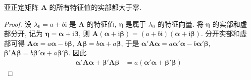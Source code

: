 \documentclass[../../main.tex]{subfiles}
\begin{document}
\begin{proposition}\label{proposition:亚正定矩阵的所有特征值的实部都大于零}
亚正定矩阵 \(\boldsymbol{A}\) 的所有特征值的实部都大于零.
\end{proposition}
\begin{proof}
设 \(\lambda_0 = a + b\mathrm{i}\) 是 \(\boldsymbol{A}\) 的特征值, \(\boldsymbol{\eta}\) 是属于 \(\lambda_0\) 的特征向量. 将 \(\boldsymbol{\eta}\) 的实部和虚部分开, 记为 \(\boldsymbol{\eta}=\boldsymbol{\alpha}+\mathrm{i}\boldsymbol{\beta}\), 则 \(\boldsymbol{A}(\boldsymbol{\alpha}+\mathrm{i}\boldsymbol{\beta})=(a + b\mathrm{i})(\boldsymbol{\alpha}+\mathrm{i}\boldsymbol{\beta})\). 分开实部和虚部可得 \(\boldsymbol{A}\boldsymbol{\alpha}=a\boldsymbol{\alpha}-b\boldsymbol{\beta}\), \(\boldsymbol{A}\boldsymbol{\beta}=b\boldsymbol{\alpha}+a\boldsymbol{\beta}\), 于是 \(\boldsymbol{\alpha}'\boldsymbol{A}\boldsymbol{\alpha}=a\boldsymbol{\alpha}'\boldsymbol{\alpha}-b\boldsymbol{\alpha}'\boldsymbol{\beta}\), \(\boldsymbol{\beta}'\boldsymbol{A}\boldsymbol{\beta}=b\boldsymbol{\beta}'\boldsymbol{\alpha}+a\boldsymbol{\beta}'\boldsymbol{\beta}\). 因此
\begin{align}
\boldsymbol{\alpha}'\boldsymbol{A}\boldsymbol{\alpha}+\boldsymbol{\beta}'\boldsymbol{A}\boldsymbol{\beta}&=a(\boldsymbol{\alpha}'\boldsymbol{\alpha}+\boldsymbol{\beta}'\boldsymbol{\beta})\label{eq:6.11}
\end{align} 
\end{proof}
\end{document}
